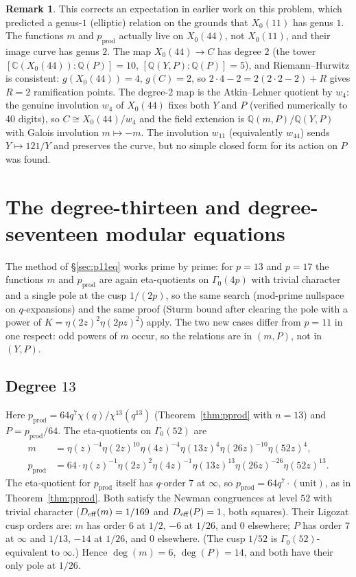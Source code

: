 \documentclass[11pt]{amsart}
\theoremstyle{plain}
\theoremstyle{definition}
\newtheorem{remark}[theorem]{Remark}
\theoremstyle{remark}
\newcommand{\Q}{\mathbb{Q}}
\newcommand{\C}{\mathbb{C}}
\newcommand{\pprod}{p_{\mathrm{prod}}}
\begin{document}
\begin{remark}
This corrects an expectation in earlier work on this problem, which predicted a
genus-$1$ (elliptic) relation on the grounds that $X_0(11)$ has genus $1$. The
functions $m$ and $\pprod$ actually live on $X_0(44)$, not $X_0(11)$, and their
image curve has genus $2$. The map $X_0(44) \to C$ has degree $2$ (the tower
$[\C(X_0(44)):\Q(P)] = 10$, $[\Q(Y,P):\Q(P)] = 5$), and Riemann--Hurwitz is
consistent: $g(X_0(44)) = 4$, $g(C) = 2$, so $2\cdot 4 - 2 = 2(2\cdot 2 - 2) + R$
gives $R = 2$ ramification points. The degree-$2$ map is the Atkin--Lehner
quotient by $w_4$: the genuine involution $w_4$ of $X_0(44)$ fixes both $Y$ and
$P$ (verified numerically to 40 digits), so $C \cong X_0(44)/w_4$ and the field
extension is $\Q(m,P)/\Q(Y,P)$ with Galois involution $m \mapsto -m$. The
involution $w_{11}$ (equivalently $w_{44}$) sends $Y \mapsto 121/Y$ and preserves
the curve, but no simple closed form for its action on $P$ was found.
\end{remark}

\section{The degree-thirteen and degree-seventeen modular equations}
\label{sec:p1317}

The method of \S\ref{sec:p11eq} works prime by prime: for $p = 13$ and $p = 17$
the functions $m$ and $\pprod$ are again eta-quotients on $\Gamma_0(4p)$ with
trivial character and a single pole at the cusp $1/(2p)$, so the same search
(mod-prime nullspace on $q$-expansions) and the same proof (Sturm bound after
clearing the pole with a power of $K = \eta(2z)^2\eta(2pz)^2$) apply. The two
new cases differ from $p = 11$ in one respect: odd powers of $m$ occur, so the
relations are in $(m,P)$, not in $(Y,P)$.

\subsection{Degree $13$}

Here $\pprod = 64q^7\chi(q)/\chi^{13}(q^{13})$ (Theorem~\ref{thm:pprod} with
$n = 13$) and $P = \pprod/64$. The eta-quotients on $\Gamma_0(52)$ are
\begin{align}
m &= \eta(z)^{-4}\eta(2z)^{10}\eta(4z)^{-4}\eta(13z)^4\eta(26z)^{-10}\eta(52z)^4, \\
\pprod &= 64\cdot\eta(z)^{-1}\eta(2z)^2\eta(4z)^{-1}\eta(13z)^{13}
\eta(26z)^{-26}\eta(52z)^{13}.
\end{align}
The eta-quotient for $\pprod$ itself has $q$-order $7$ at $\infty$, so
$\pprod = 64q^7\cdot(\text{unit})$, as in Theorem~\ref{thm:pprod}.
Both satisfy the Newman congruences at level $52$ with trivial character
($D_{\rm eff}(m) = 1/169$ and $D_{\rm eff}(P) = 1$, both squares). Their
Ligozat cusp orders are: $m$ has order $6$ at $1/2$, $-6$ at $1/26$, and $0$
elsewhere; $P$ has order $7$ at $\infty$ and $1/13$, $-14$ at $1/26$,
and $0$ elsewhere. (The cusp $1/52$ is $\Gamma_0(52)$-equivalent to $\infty$.)
Hence $\deg(m) = 6$, $\deg(P) = 14$, and both have their
only pole at $1/26$.
\end{document}
